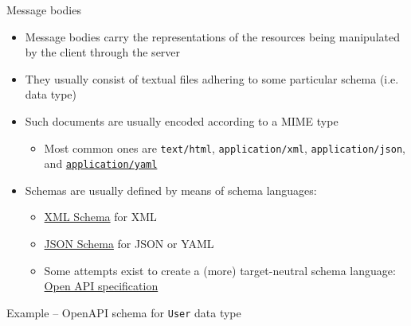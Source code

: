 \documentclass[presentation]{beamer}\mode<presentation>{\usetheme{AMSCesenaPurpleAndGold}}
\begin{document}
\begin{frame}{Message bodies}
    \begin{itemize}
        \item Message bodies carry the \alert{representations} of the resources being manipulated by the client through the server
        
        \vfill
        
        \item They usually consist of \alert{textual files} adhering to some particular \alert{schema} (i.e. data type)
        
        \vfill
        
        \item Such documents are usually \alert{encoded} according to a MIME type
        \begin{itemize}
            \item Most common ones are \texttt{text/\alert{html}}, \texttt{application/\alert{xml}}, \texttt{application/\alert{json}}, and \href{https://en.wikipedia.org/wiki/YAML}{\texttt{application/\alert{yaml}}}
        \end{itemize}
        
        \vfill
        
        \item Schemas are usually defined by means of \alert{schema languages}:
        \begin{itemize}
            \item \href{https://www.w3schools.com/xml/schema_intro.asp}{XML Schema} for XML
            
            \item \href{https://json-schema.org/learn/getting-started-step-by-step.html}{JSON Schema} for JSON or YAML
            
            \item Some attempts exist to create a (more) target-neutral schema language: \href{https://swagger.io/specification/\#schemaObject}{Open API specification}
        \end{itemize}
    \end{itemize}
\end{frame}


\begin{frame}{Example -- OpenAPI schema for \texttt{User} data type}
    \vspace{-.7cm}
    \begin{columns}[t]
        \begin{column}{.49\textwidth}
            
        \end{column}
        \hfill
        \begin{column}{.49\textwidth}
            
            
        \end{column}
    \end{columns}
\end{frame}
\end{document}
